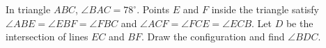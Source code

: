 In triangle $ABC$, $\angle BAC=78^\circ$. Points $E$ and $F$ inside the triangle satisfy $\angle ABE=\angle EBF=\angle FBC$ and $\angle ACF=\angle FCE=\angle ECB$. Let $D$ be the intersection of lines $EC$ and $BF$. Draw the configuration and find $\angle BDC$.
